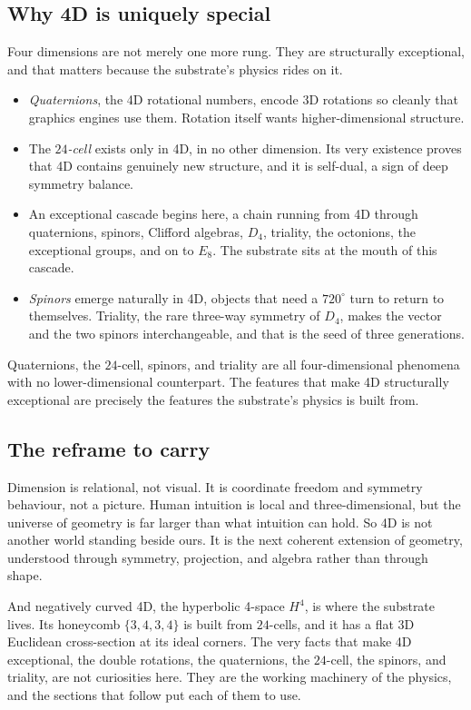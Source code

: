 \subsection{Why 4D is uniquely special}

Four dimensions are not merely one more rung. They are structurally exceptional, and that matters because the substrate's physics rides on it.

\begin{itemize}
  \item \emph{Quaternions}, the 4D rotational numbers, encode 3D rotations so cleanly that graphics engines use them. Rotation itself wants higher-dimensional structure.
  \item The \emph{$24$-cell} exists only in 4D, in no other dimension. Its very existence proves that 4D contains genuinely new structure, and it is self-dual, a sign of deep symmetry balance.
  \item An exceptional cascade begins here, a chain running from 4D through quaternions, spinors, Clifford algebras, $D_4$, triality, the octonions, the exceptional groups, and on to $E_8$. The substrate sits at the mouth of this cascade.
  \item \emph{Spinors} emerge naturally in 4D, objects that need a $720^\circ$ turn to return to themselves. Triality, the rare three-way symmetry of $D_4$, makes the vector and the two spinors interchangeable, and that is the seed of three generations.
\end{itemize}

\begin{result}
Quaternions, the $24$-cell, spinors, and triality are all four-dimensional phenomena with no lower-dimensional counterpart. The features that make 4D structurally exceptional are precisely the features the substrate's physics is built from.
\end{result}

\subsection{The reframe to carry}

Dimension is relational, not visual. It is coordinate freedom and symmetry behaviour, not a picture. Human intuition is local and three-dimensional, but the universe of geometry is far larger than what intuition can hold. So 4D is not another world standing beside ours. It is the next coherent extension of geometry, understood through symmetry, projection, and algebra rather than through shape.

And negatively curved 4D, the hyperbolic 4-space $H^4$, is where the substrate lives. Its honeycomb $\{3,4,3,4\}$ is built from $24$-cells, and it has a flat 3D Euclidean cross-section at its ideal corners. The very facts that make 4D exceptional, the double rotations, the quaternions, the $24$-cell, the spinors, and triality, are not curiosities here. They are the working machinery of the physics, and the sections that follow put each of them to use.
